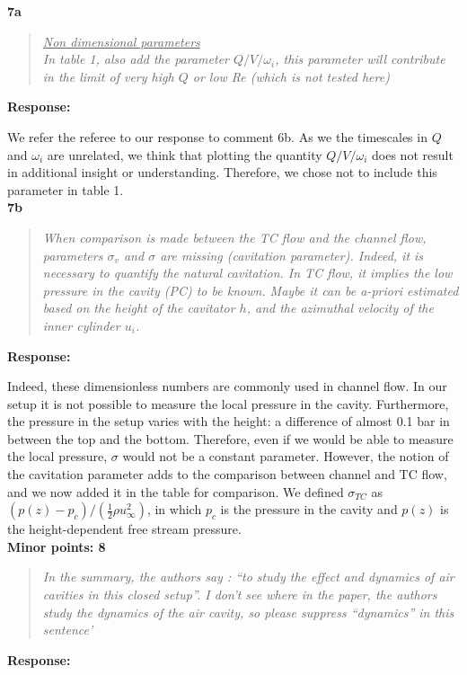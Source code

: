 \documentclass[10pt]{article}
\newcommand{\strong}[1]{\textbf{#1}}
\newcommand{\question}[1]{\begin{quote} \emph{#1}  \end{quote} }
\begin{document}
\noindent \strong{7a}

\question{\underline{Non dimensional parameters} \\
In table 1, also add the parameter $Q/V/\omega_i$, this parameter will contribute in the limit of very high $Q$ or low Re (which is not tested here)
 }

\noindent \strong{Response:} 

\noindent We refer the referee to our response to comment 6b. As we the timescales in $Q$ and $\omega_i$ are unrelated, we think that plotting the quantity $Q/V/\omega_i$ does not result in additional insight or understanding. Therefore, we chose not to include this parameter in table 1.\\

\noindent \strong{7b}

\question{When comparison is made between the TC flow and the channel flow, parameters $\sigma_v$ and $\sigma$ are missing (cavitation parameter). Indeed, it is necessary to quantify the natural cavitation. In TC flow, it implies the low pressure in the cavity (PC) to be known. Maybe it can be a-priori estimated based on the height of the cavitator $h$, and the azimuthal velocity of the inner cylinder $u_i$.
}

\noindent \strong{Response:} 

\noindent Indeed, these dimensionless numbers are commonly used in channel flow. In our setup it is not possible to measure the local pressure in the cavity. Furthermore, the pressure in the setup varies with the height: a difference of almost 0.1 bar in between the top and the bottom. Therefore, even if we would be able to measure the local pressure, $\sigma$ would not be a constant parameter.
However, the notion of the cavitation parameter adds to the comparison between channel and TC flow, and we now added it in the table for comparison. We defined $\sigma_{TC}$ as $(p(z) - p_c) / (\frac12 \rho u_{\infty}^2)$, in which $p_c$ is the pressure in the cavity and $p(z)$ is the height-dependent free stream pressure. \\

\noindent \strong{Minor points: 8}

\question{In the summary, the authors say : ``to study the effect and dynamics of air cavities in this closed setup''. I don't see where in the paper, the authors study the dynamics of the air cavity, so please suppress ``dynamics'' in this sentence'
 }

\noindent \strong{Response:} 
\end{document}
